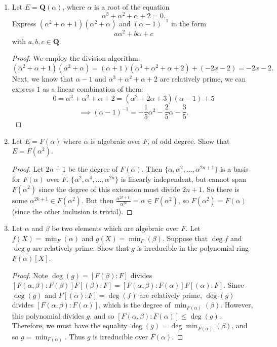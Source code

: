 \documentclass[10pt]{article}
\newcommand{\Q}{\mathbf{Q}}
\begin{document}
\begin{enumerate}
\begin{enumerate}
\begin{proof}
\end{proof}

\end{enumerate}
\setcounter{enumi}{0}
\item Let $E = \Q(\alpha)$, where $\alpha$ is a root of the equation
$$
\alpha^3 + \alpha^2 + \alpha + 2 = 0.
$$
Express $(\alpha^2 + \alpha + 1)(\alpha^2+\alpha)$ and $(\alpha-1)^{-1}$ in the form
$$
a\alpha^2 + b\alpha + c
$$
with $a,b,c \in \Q$.

\begin{proof}
We employ the division algorithm:
$$
(\alpha^2 + \alpha + 1)(\alpha^2+\alpha) = (\alpha + 1)(\alpha^3 + \alpha^2 + \alpha + 2) + (-2x-2) = -2x-2.
$$
Next, we know that $\alpha - 1$ and $\alpha^3 + \alpha^2 + \alpha + 2$ are relatively prime, we can express $1$ as a linear combination of them:
$$
0 = \alpha^3 + \alpha^2 + \alpha + 2 = (\alpha^2 + 2\alpha + 3)(\alpha - 1) + 5
$$
$$
\implies (\alpha - 1)^{-1} = -\frac15 \alpha^2 - \frac25 \alpha - \frac35.
$$
\end{proof}

\item Let $E = F(\alpha)$ where $\alpha$ is algebraic over $F$, of odd degree.  Show that $E = F(\alpha^2)$.

\begin{proof}
Let $2n+1$ be the degree of $F(\alpha)$.  Then $\{\alpha, \alpha^2, \dots , \alpha^{2n+1}\}$ is a basis for $F(\alpha)$ over $F$.  $\{\alpha^2, \alpha^4, \dots , \alpha^{2n}\}$ is linearly independent, but cannot span $F(\alpha^2)$ since the degree of this extension must divide $2n+1$.  So there is some $\alpha^{2k+1} \in F(\alpha^2)$.  But then $\frac{\alpha^{2k+1]}}{\alpha^{2k}} = \alpha \in F(\alpha^2)$, so $F(\alpha^2) = F(\alpha)$ (since the other inclusion is trivial).
\end{proof}

\item Let $\alpha$ and $\beta$ be two elements which are algebraic over $F$.  Let $f(X) = \min_F(\alpha)$ and $g(X) = \min_F(\beta)$.  Suppose that $\deg f$ and $\deg g$ are relatively prime.  Show that $g$ is irreducible in the polynomial ring $F(\alpha)[X]$.

\begin{proof}

Note $\deg(g) = [F(\beta):F]$ divides $[F(\alpha,\beta):F(\beta)]F[(\beta):F] = [F(\alpha,\beta):F(\alpha)]F[(\alpha):F]$.  Since $\deg(g)$ and $F[(\alpha):F] = \deg(f)$ are relatively prime, $\deg(g)$ divides $[F(\alpha,\beta):F(\alpha)]$, which is the degree of $\min_{F(\alpha)}(\beta)$.  However, this polynomial divides $g$, and so $[F(\alpha,\beta):F(\alpha)] \leq \deg (g)$.  Therefore, we must have the equality $\deg(g) = \deg \min_{F(\alpha)}(\beta)$, and so $g = \min_{F(\alpha)}$.  Thus $g$ is irreducible over $F(\alpha)$.


\end{proof}
\end{enumerate}
\end{document}
